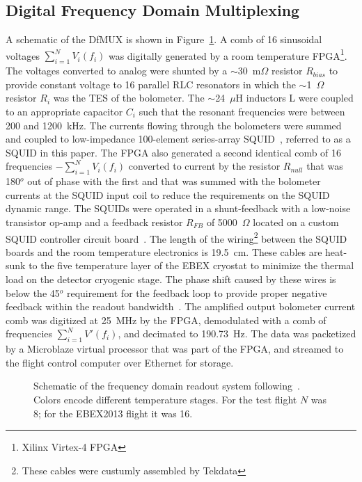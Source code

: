 \documentclass[../EBEXPaper2.tex]{subfiles}
\begin{document}
\subsection{Digital Frequency Domain Multiplexing}
\label{sec:dfmux}

A schematic of the \ac{DfMUX} is shown in Figure~\ref{fig:dfmux_schematic}.
A comb of 16 sinusoidal voltages $\sum_{i=1}^N{V_i (f_i)}$ was digitally generated by a room temperature \ac{FPGA}\footnote{Xilinx Virtex-4 \ac{FPGA}}. 
The voltages converted to analog were shunted by a $\sim$30~m$\Omega$ resistor $R_{bias}$ to provide constant voltage to 16 parallel RLC resonators in which the $\sim$1~$\Omega$ resistor $R_i$ was the \ac{TES} of the bolometer.
The $\sim$24~$\mu$H inductors L were coupled to an appropriate capacitor $C_i$ such that the resonant frequencies were between 200 and 1200~kHz. 
The currents flowing through the bolometers were summed and coupled to low-impedance 100-element series-array \ac{SQUID}~\citep{Huber2001}, referred to as a \ac{SQUID} in this paper.
The \ac{FPGA} also generated a second identical comb of 16 frequencies $-\sum_{i=1}^N{V_i(f_i)}$ converted to current by the resistor $R_{null}$ that was 180$^o$ out of phase with the first and that was summed with the bolometer currents at the \ac{SQUID} input coil to reduce the requirements on the \ac{SQUID} dynamic range.
The \ac{SQUID}s were operated in a shunt-feedback with a low-noise transistor op-amp and a feedback resistor $R_{FB}$ of 5000~$\Omega$ located on a custom \ac{SQUID} controller circuit board~\citep{lanting_thesis}.
The length of the wiring\footnote{These cables were custumly assembled by Tekdata} between the \ac{SQUID} boards and the room temperature electronics is 19.5~cm.
These cables are heat-sunk to the five temperature layer of the \ac{EBEX} cryostat to minimize the thermal load on the detector cryogenic stage.
The phase shift caused by these wires is below the 45$^o$ requirement for the feedback loop to provide proper negative feedback within the readout bandwidth~\citep{dobbs_revSciInst_2012}.
The amplified output bolometer current comb was digitized at 25~MHz by the \ac{FPGA}, demodulated with a comb of frequencies $\sum_{i=1}^N{V'(f_i)}$, and decimated to 190.73~Hz.
The data was packetized by a Microblaze virtual processor that was part of the \ac{FPGA}, and streamed to the flight control computer over Ethernet for storage.
\begin{figure}[htbp]
\begin{center}
\caption{Schematic of the frequency domain readout system following~\citet{aubin_thesis}.
Colors encode different temperature stages. For the test flight $N$ was 8; for the \ac{EBEX2013} flight it was 16.
\label{fig:dfmux_schematic} }
\end{center}
\end{figure}
\end{document}
